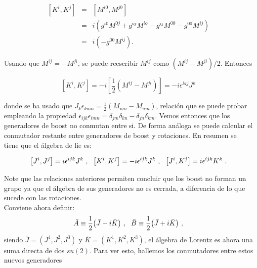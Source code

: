 \begin{eqnarray*}
\left[ K^{i},K^{j}\right]  &=&\left[ M^{i0},M^{j0}\right]  \\
&=&i\left( g^{i0}M^{0j}+g^{oj}M^{io}-g^{ij}M^{00}-g^{00}M^{ij}\right)  \\
&=&i\left( -g^{00}M^{ij}\right) .
\end{eqnarray*}

Usando que $M^{ij}=-M^{ji}$, se puede reescribir $M^{ij}$ como $\left(M^{ij}-M^{ji}\right) /2$. Entonces

\begin{equation}
\left[ K^{i},K^{j}\right] =-i\left[ \frac{1}{2}\left( M^{ij}-M^{ji}\right) 
\right] =-i\epsilon ^{kij}J^{k}
\end{equation}

donde se ha usado que $J_{k}\epsilon _{kmn}=\frac{1}{2}\left(M_{mn}-M_{nm}\right) $, relaci\'{o}n que se puede probar empleando la propiedad $\epsilon _{ijk}\epsilon _{imn}=\delta _{jm}\delta _{kn}-\delta_{jn}\delta _{km}$. Vemos entonces que los generadores de boost no conmutan entre si. De forma análoga se puede calcular el conmutador restante entre generadores de boost y rotaciones. En resumen se tiene que el álgebra de lie es:

\begin{equation}
    \comm{J^{i}}{J^{j}}=i\epsilon^{ijk}J^{k}~,~~\comm{K^{i}}{K^{j}}=-i\epsilon^{ijk}J^{k}~,~~\comm{J^{i}}{K^{j}}=i\epsilon^{ijk}K^{k}   ~.     
\end{equation}

Note que las relaciones anteriores permiten concluir que los boost no forman un grupo ya que el álgebra de sus generadores no es cerrada, a diferencia de lo que sucede con las rotaciones.\\

Conviene ahora definir:
\begin{equation}
    \bar{A}\equiv \frac{1}{2} \qty(\bar{J}-i\bar{K})~,~~ \bar{B}\equiv \frac{1}{2} \qty(\bar{J}+i\bar{K})~,
\end{equation}
siendo $\bar{J}=(J^{1},J^{2},J^{3})$ y $\bar{K}=(K^{1},K^{2},K^{3})$, el álgebra de Lorentz es ahora una suma directa de dos $su(2)$. Para ver esto, hallemos los conmutadores entre estos nuevos generadores

